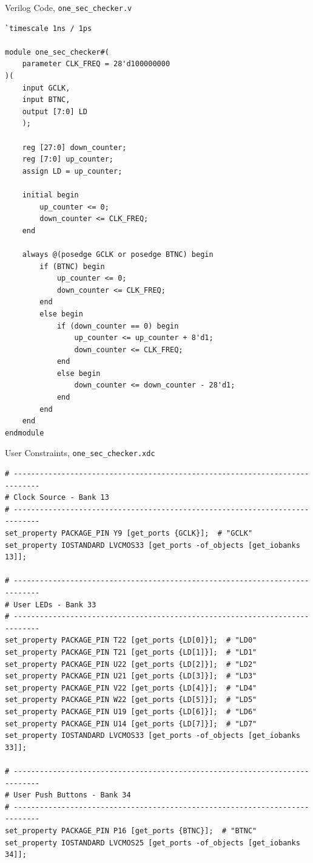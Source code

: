 \documentclass{article}
\begin{document}
\begin{itemize*}
\item Verilog Code, \texttt{one\_sec\_checker.v}
\begin{lstlisting}[style={verilog-style}]
`timescale 1ns / 1ps

module one_sec_checker#(
    parameter CLK_FREQ = 28'd100000000
)(
    input GCLK,
    input BTNC,
    output [7:0] LD
    );
    
    reg [27:0] down_counter;
    reg [7:0] up_counter;
    assign LD = up_counter;
    
    initial begin
        up_counter <= 0;
        down_counter <= CLK_FREQ;
    end
    
    always @(posedge GCLK or posedge BTNC) begin
        if (BTNC) begin
            up_counter <= 0;
            down_counter <= CLK_FREQ;
        end
        else begin
            if (down_counter == 0) begin
                up_counter <= up_counter + 8'd1;
                down_counter <= CLK_FREQ;
            end
            else begin
                down_counter <= down_counter - 28'd1;
            end
        end
    end
endmodule
\end{lstlisting}

\item User Constraints, \texttt{one\_sec\_checker.xdc}
\begin{lstlisting}[style={verilog-style}]
# ----------------------------------------------------------------------------
# Clock Source - Bank 13
# ---------------------------------------------------------------------------- 
set_property PACKAGE_PIN Y9 [get_ports {GCLK}];  # "GCLK"
set_property IOSTANDARD LVCMOS33 [get_ports -of_objects [get_iobanks 13]];

# ----------------------------------------------------------------------------
# User LEDs - Bank 33
# ---------------------------------------------------------------------------- 
set_property PACKAGE_PIN T22 [get_ports {LD[0]}];  # "LD0"
set_property PACKAGE_PIN T21 [get_ports {LD[1]}];  # "LD1"
set_property PACKAGE_PIN U22 [get_ports {LD[2]}];  # "LD2"
set_property PACKAGE_PIN U21 [get_ports {LD[3]}];  # "LD3"
set_property PACKAGE_PIN V22 [get_ports {LD[4]}];  # "LD4"
set_property PACKAGE_PIN W22 [get_ports {LD[5]}];  # "LD5"
set_property PACKAGE_PIN U19 [get_ports {LD[6]}];  # "LD6"
set_property PACKAGE_PIN U14 [get_ports {LD[7]}];  # "LD7"
set_property IOSTANDARD LVCMOS33 [get_ports -of_objects [get_iobanks 33]];

# ----------------------------------------------------------------------------
# User Push Buttons - Bank 34
# ---------------------------------------------------------------------------- 
set_property PACKAGE_PIN P16 [get_ports {BTNC}];  # "BTNC"
set_property IOSTANDARD LVCMOS25 [get_ports -of_objects [get_iobanks 34]];
\end{lstlisting}
\end{itemize*}
\end{document}
